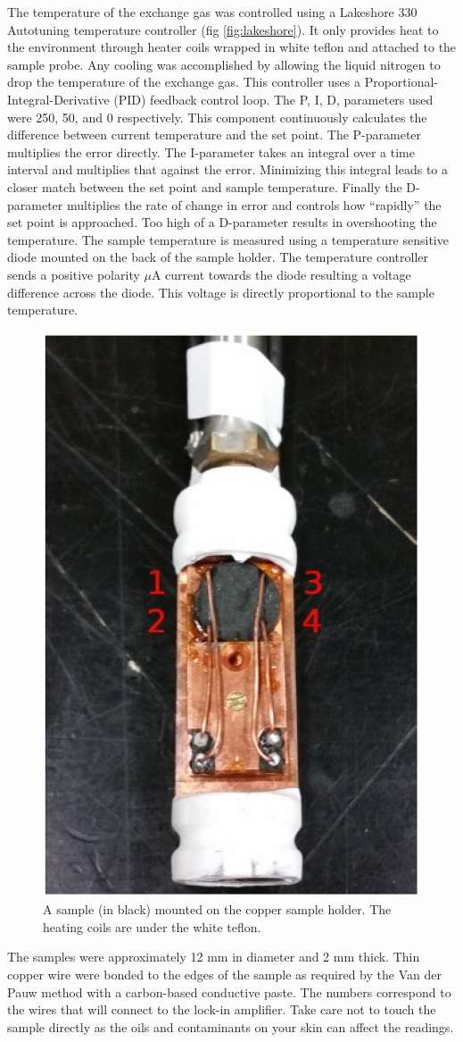 \documentclass[
reprint,
amsmath,amssymb,
aps,
tikz,
border=5pt
]{revtex4-1}
\begin{document}
    
    The temperature of the exchange gas was controlled using a Lakeshore 330 Autotuning temperature controller (fig \ref{fig:lakeshore}). It only provides heat to the environment through heater coils wrapped in white teflon and attached to the sample probe. Any cooling was accomplished by allowing the liquid nitrogen to drop the temperature of the exchange gas. This controller uses a Proportional-Integral-Derivative (PID) feedback control loop. The P, I, D, parameters used were 250, 50, and 0 respectively. This component continuously  calculates the difference between current temperature and the set point. The P-parameter multiplies the error directly. The I-parameter takes an integral over a time interval and multiplies that against the error. Minimizing this integral leads to a closer match between the set point and sample temperature. Finally the D-parameter multiplies the rate of change in error and controls how ``rapidly'' the set point is approached. Too high of a D-parameter results in overshooting the temperature. The sample temperature is measured using a temperature sensitive diode mounted on the back of the sample holder. The temperature controller sends a positive polarity $\mu$A current towards the diode resulting a voltage difference across the diode. This voltage is directly proportional to the sample temperature. 
    
    \begin{figure}[t]
      \includegraphics[width=0.25 \textwidth]{figures/sampleHolder.png}
      \caption{A sample (in black) mounted on the copper sample holder. The heating coils are under the white teflon.}
      \label{fig:sample}
    \end{figure}


    The samples were approximately 12 mm in diameter and 2 mm thick. Thin copper wire were bonded to the edges of the sample as required by the Van der Pauw method with a carbon-based conductive paste. The numbers correspond to the wires that will connect to the lock-in amplifier. Take care not to touch the sample directly as the oils and contaminants on your skin can affect the readings. 
\end{document}
